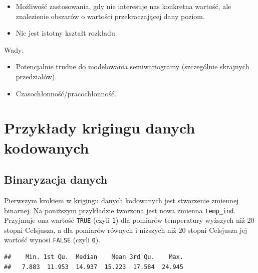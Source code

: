 \documentclass[
  paper=6in:9in,pagesize=pdftex,headinclude=on,footinclude=on,10pt]{scrbook}
\newenvironment{Shaded}{\begin{snugshade}}{\end{snugshade}}
\newcommand{\DecValTok}[1]{\textcolor[rgb]{0.00,0.00,0.81}{#1}}
\newcommand{\FunctionTok}[1]{\textcolor[rgb]{0.13,0.29,0.53}{\textbf{#1}}}
\newcommand{\NormalTok}[1]{#1}
\newcommand{\OtherTok}[1]{\textcolor[rgb]{0.56,0.35,0.01}{#1}}
\newcommand{\SpecialCharTok}[1]{\textcolor[rgb]{0.81,0.36,0.00}{\textbf{#1}}}
\providecommand{\tightlist}{%
  \setlength{\itemsep}{0pt}\setlength{\parskip}{0pt}}
\begin{document}
\begin{itemize}
\tightlist
\item
  Możliwość zastosowania, gdy nie interesuje nas konkretna wartość, ale znalezienie obszarów o wartości przekraczającej dany poziom.
\item
  Nie jest istotny kształt rozkładu.
\end{itemize}

Wady:

\begin{itemize}
\tightlist
\item
  Potencjalnie trudne do modelowania semiwariogramy (szczególnie skrajnych przedziałów).
\item
  Czasochłonność/pracochłonność.
\end{itemize}

\section{Przykłady krigingu danych kodowanych}\label{przykux142ady-krigingu-danych-kodowanych}

\subsection{Binaryzacja danych}\label{binaryzacja-danych}

Pierwszym krokiem w krigingu danych kodowanych jest stworzenie zmiennej binarnej.
Na poniższym przykładzie tworzona jest nowa zmienna \texttt{temp\_ind}.
Przyjmuje ona wartość \texttt{TRUE} (czyli \texttt{1}) dla pomiarów temperatury wyższych niż 20 stopni Celsjusza, a dla pomiarów równych i niższych niż 20 stopni Celsjusza jej wartość wynosi \texttt{FALSE} (czyli \texttt{0}).

\begin{Shaded}
\end{Shaded}

\begin{verbatim}
##    Min. 1st Qu.  Median    Mean 3rd Qu.    Max. 
##   7.883  11.953  14.937  15.223  17.584  24.945
\end{verbatim}

\begin{Shaded}
\end{Shaded}
\end{document}

